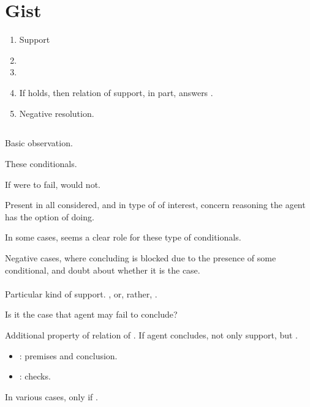 \section{Gist}

\begin{note}
  \begin{enumerate}
  \item
    Support
  \item
  \item
    \qzS{}
  \item
    If \qzS{} holds, then relation of support, in part, answers \qWhy{}.
  \item
    Negative resolution.
  \end{enumerate}
\end{note}

\subsection{\zS{}}
\label{sec:zs}

\begin{note}
  Basic observation.

  These conditionals.

  If were to fail, would not.

  Present in all  considered, and in type of  of interest, concern reasoning the agent has the option of doing.

  In some cases, seems a clear role for these type of conditionals.
\end{note}

\begin{note}
  Negative cases, where concluding is blocked due to the presence of some conditional, and doubt about whether it is the case.
\end{note}

\paragraph{}

\begin{note}[`\zSN{0}']
  Particular kind of support.
  , or, rather, \zS{}.

  Is it the case that agent may fail to conclude?

  Additional property of relation of \support{}.
  If agent concludes, not only support, but \zS{}.
  \begin{itemize}
  \item
    : premises and conclusion.
  \item
    \zS{}: checks.
  \end{itemize}

  In various cases, \support{} only if \zS{}.
\end{note}


